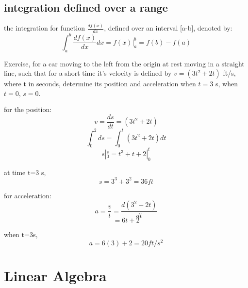 \documentclass[4apaper,12pt]{book}
\begin{document}
  \section{integration defined over a range}
  \begin{description}
  \item the integration for function $\frac{df(x)}{dx}$, defined over an interval [a-b], denoted by:
    \begin{equation} \int_{a}^{b}\frac{df(x)}{dx} dx= f(x) |_{a}^{b} = f(b) - f(a) \end{equation}
  \end{description}
  \begin{description}
  \item Exercise, for a car moving to the left from the origin at rest moving in a straight line, such that for a short time it's velocity is defined by $v=(3t^2+2t)$ ft/s, where t in seconds, determine its position and acceleration when $t=3$ s, when $t=0$, $s=0$.
    \item for the position:
       \begin{equation} v = \frac{ds}{dt} = (3t^2+2t) \end{equation}
       \begin{equation} \int_{0}^{2} ds = \int_{0}^{t} (3t^2 + 2t)dt \end{equation}
       \begin{equation} s|_{0}^{s} = t^3 + t+2|_{0}^{t} \end{equation}
     \item at time t=3 s,
       \begin{equation} s = 3^3 + 3^2 = 36 ft \end{equation}
     \item for acceleration:
       \begin{equation} a = \frac{v}{t} = \frac{d(3^2+2t)}{dt} \end{equation}
       \begin{equation}  = 6t + 2 \end{equation}
     \item when t=3s,
       \begin{equation} a = 6(3) + 2 = 20 ft/s^2 \end{equation}
  \end{description}
  \chapter{Linear Algebra}
\end{document}
